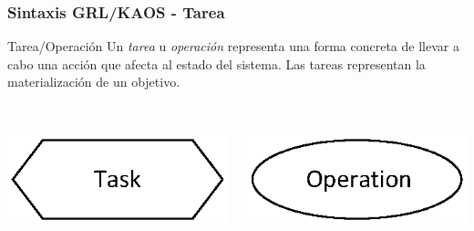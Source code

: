 \documentclass[slidestop,xcolor=pst,dvips,blue]{beamer}
\begin{document}
\begin{frame}[c]
	\frametitle{Sintaxis GRL/KAOS - Tarea}
	\begin{block}{Tarea/Operación}
		Un \alert{\emph{tarea}} u \alert{\emph{operación}} representa una forma concreta de llevar a cabo una acción que afecta al estado del sistema.
		Las tareas representan la materialización de un objetivo.
		\ \\
		\ \\
		\begin{columns}[c]
			\begin{column}{0.50\linewidth}
				\centering \includegraphics[width=0.5\columnwidth,keepaspectratio=true]{images/objetivos/task(GRL).eps}
			\end{column}
			\begin{column}{0.50\linewidth}
				\centering \includegraphics[width=0.5\columnwidth,keepaspectratio=true]{images/objetivos/operation(KAOS).eps}
			\end{column}
		\end{columns}
	\end{block}
\end{frame}
\end{document}
